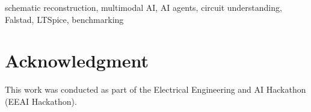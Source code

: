\documentclass[conference]{IEEEtran}
\begin{document}


\author{
\and
{}
\and
{}
}

\maketitle



\begin{IEEEkeywords}
schematic reconstruction, multimodal AI, AI agents, circuit understanding, Falstad, LTSpice, benchmarking
\end{IEEEkeywords}









\section*{Acknowledgment}

This work was conducted as part of the Electrical Engineering and AI Hackathon (EEAI Hackathon).
\end{document}
